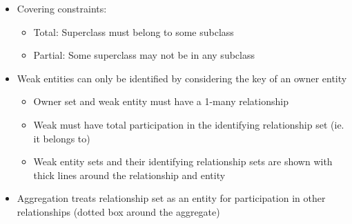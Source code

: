 \documentclass[8pt,landscape,a4paper, fleqn, dvipsnames]{extarticle}
\begin{document}
\begin{multicols*}{4}
\begin{itemize}
    \item Covering constraints:
    \begin{itemize}
        \item Total: Superclass must belong to some subclass
        \item Partial: Some superclass may not be in any subclass
    \end{itemize}
    \item Weak entities can only be identified by considering the key of an owner entity
    \begin{itemize}
        \item Owner set and weak entity must have a 1-many relationship
        \item Weak must have total participation in the identifying relationship set (ie. it belongs to)
        \item Weak entity sets and their identifying relationship sets are shown with thick lines around the relationship and entity
    \end{itemize}
    \item Aggregation treats relationship set as an entity for participation in other relationships (dotted box around the aggregate)
    \end{itemize}


\end{multicols*}
\end{document}
